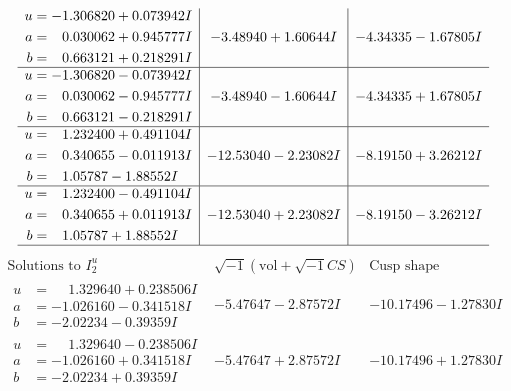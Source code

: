\documentclass[1p]{elsarticle_modified}
\theoremstyle{definition}
\newcommand{\I}{\sqrt{-1}}
\begin{document}
$$\begin{array}{c|c|c}
\begin{aligned}
u &= -1.306820 + 0.073942 I \\
a &= \phantom{-}0.030062 + 0.945777 I \\
b &= \phantom{-}0.663121 + 0.218291 I\end{aligned}
 & -3.48940 + 1.60644 I & -4.34335 - 1.67805 I \\ \hline\begin{aligned}
u &= -1.306820 - 0.073942 I \\
a &= \phantom{-}0.030062 - 0.945777 I \\
b &= \phantom{-}0.663121 - 0.218291 I\end{aligned}
 & -3.48940 - 1.60644 I & -4.34335 + 1.67805 I \\ \hline\begin{aligned}
u &= \phantom{-}1.232400 + 0.491104 I \\
a &= \phantom{-}0.340655 - 0.011913 I \\
b &= \phantom{-}1.05787 - 1.88552 I\end{aligned}
 & -12.53040 - 2.23082 I & -8.19150 + 3.26212 I \\ \hline\begin{aligned}
u &= \phantom{-}1.232400 - 0.491104 I \\
a &= \phantom{-}0.340655 + 0.011913 I \\
b &= \phantom{-}1.05787 + 1.88552 I\end{aligned}
 & -12.53040 + 2.23082 I & -8.19150 - 3.26212 I\\
 \hline 
 \end{array}$$\newpage$$\begin{array}{c|c|c}  
\text{Solutions to }I^u_{2}& \I (\text{vol} + \sqrt{-1}CS) & \text{Cusp shape}\\
 \hline 
\begin{aligned}
u &= \phantom{-}1.329640 + 0.238506 I \\
a &= -1.026160 - 0.341518 I \\
b &= -2.02234 - 0.39359 I\end{aligned}
 & -5.47647 - 2.87572 I & -10.17496 - 1.27830 I \\ \hline\begin{aligned}
u &= \phantom{-}1.329640 - 0.238506 I \\
a &= -1.026160 + 0.341518 I \\
b &= -2.02234 + 0.39359 I\end{aligned}
 & -5.47647 + 2.87572 I & -10.17496 + 1.27830 I \\ \hline\begin{aligned}

\end{aligned}
\end{array}$$
\end{document}
